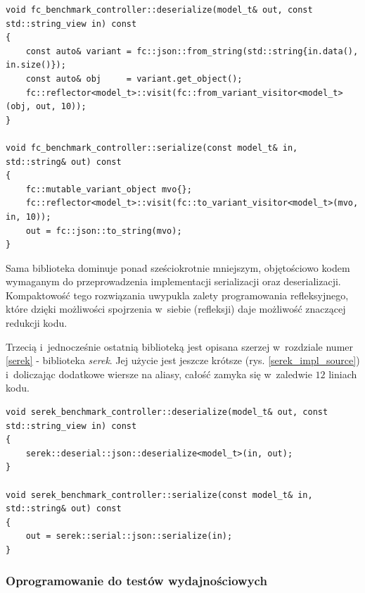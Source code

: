 \documentclass[12pt]{article}
\newcommand{\n}{\newline}
\newcommand{\nonpl}[1]{{\it #1}}
\newcommand{\serek}{\nonpl{serek}}
\begin{document}
{{{				\begin{captioned}[H]
					\begin{lstlisting}[frame=single]
void fc_benchmark_controller::deserialize(model_t& out, const std::string_view in) const
{
	const auto& variant = fc::json::from_string(std::string{in.data(), in.size()});
	const auto& obj	    = variant.get_object();
	fc::reflector<model_t>::visit(fc::from_variant_visitor<model_t>(obj, out, 10));
}

void fc_benchmark_controller::serialize(const model_t& in, std::string& out) const
{
	fc::mutable_variant_object mvo{};
	fc::reflector<model_t>::visit(fc::to_variant_visitor<model_t>(mvo, in, 10));
	out = fc::json::to_string(mvo);
}
					\end{lstlisting}
					\caption{ Implementacje funkcji do serializacji i~deserializacji przy wykorzystaniu biblioteki \nonpl{fc}.}
					\label{fc_impl_source}
				\end{captioned}

				Sama biblioteka dominuje ponad sześciokrotnie mniejszym, objętościowo kodem wymaganym do przeprowadzenia implementacji
				serializacji oraz deserializacji. Kompaktowość tego rozwiązania uwypukla zalety programowania refleksyjnego, które dzięki
				możliwości spojrzenia w~siebie (refleksji) daje możliwość znaczącej redukcji kodu.\n

				Trzecią i~jednocześnie ostatnią biblioteką jest opisana szerzej w~rozdziale numer \ref{serek} - biblioteka \serek.
				Jej użycie jest jeszcze krótsze (rys. \ref{serek_impl_source}) i~doliczając dodatkowe wiersze na aliasy,
				całość zamyka się w~zaledwie $12$ liniach kodu.\n

				\begin{captioned}[H]
					\begin{lstlisting}[frame=single]
void serek_benchmark_controller::deserialize(model_t& out, const std::string_view in) const
{
	serek::deserial::json::deserialize<model_t>(in, out);
}

void serek_benchmark_controller::serialize(const model_t& in, std::string& out) const
{
	out = serek::serial::json::serialize(in);
}
					\end{lstlisting}
					\caption{ Implementacje odpowiednio funkcji do deserializacji i~serializacji przy wykorzystaniu biblioteki \serek.}
					\label{serek_impl_source}
				\end{captioned}
			}

			{
				\subsubsection{Oprogramowanie do testów wydajnościowych}

}}}
\end{document}
